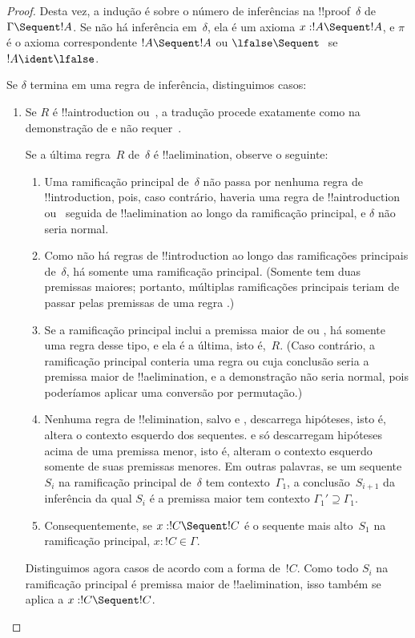 \documentclass[../../../include/open-logic-section]{subfiles}
\begin{document}
\begin{proof}
Desta vez, a indução é sobre o número de inferências na
!!{proof}~$\delta$ de $\Gamma \Sequent !A$. Se não há inferência
em~$\delta$, ela é um axioma $x:!A \Sequent !A$, e $\pi$ é o axioma
correspondente $!A \Sequent !A$ ou $\lfalse \Sequent \ $ se $!A
\ident \lfalse$.

Se $\delta$ termina em uma regra de inferência, distinguimos casos:
\begin{enumerate}
  \item Se $R$ é !!a{introduction} ou~\FalseInt, a
  tradução procede exatamente como na demonstração de
   e não requer~\Cut.

  Se a última regra~$R$ de~$\delta$ é !!a{elimination}, observe o
  seguinte:
  \begin{enumerate}
    \item Uma ramificação principal de~$\delta$ não passa por nenhuma
    regra de !!{introduction}, pois, caso contrário, haveria uma
    regra de !!a{introduction} ou~\FalseInt{} seguida de !!a{elimination}
    ao longo da ramificação principal, e $\delta$ não seria normal.
    \item Como não há regras de !!{introduction} ao longo das ramificações
    principais de~$\delta$, há somente uma ramificação principal. (Somente
    \Intro{\land} tem duas premissas maiores; portanto, múltiplas ramificações
    principais teriam de passar pelas premissas de uma regra \Intro{\land}.)
    \item Se a ramificação principal inclui a premissa maior de \Elim{\lor}
    ou \Elim{\lexists}, há somente uma regra desse tipo, e ela é a última,
    isto é,~$R$. (Caso contrário, a ramificação principal conteria uma regra
    \Elim{\lor} ou \Elim{\lexists} cuja conclusão seria a premissa maior de
    !!a{elimination}, e a demonstração não seria normal, pois poderíamos aplicar
    uma conversão por permutação.)
  \item Nenhuma regra de !!{elimination}, salvo \Elim{\lor} e
  \Elim{\lexists}, descarrega hipóteses, isto é, altera o contexto esquerdo
  dos sequentes. \Elim{\lor} e \Elim{\lexists} só descarregam
  hipóteses acima de uma premissa menor, isto é, alteram o contexto esquerdo
  somente de suas premissas menores. Em outras palavras, se um sequente $S_i$
  na ramificação principal de~$\delta$ tem contexto~$\Gamma_1$, a
  conclusão~$S_{i+1}$ da inferência da qual $S_i$ é a premissa maior tem
  contexto $\Gamma_1' \supseteq \Gamma_1$.
  \item Consequentemente, se $x: !C \Sequent !C$ é o sequente
  mais alto~$S_1$ na ramificação principal, $x:!C \in \Gamma$. 
  \end{enumerate}
  Distinguimos agora casos de acordo com a forma de~$!C$. Como todo
  $S_i$ na ramificação principal é premissa maior de !!a{elimination},
  isso também se aplica a $x:!C \Sequent !C$.


\end{enumerate}
\end{proof}
\end{document}
